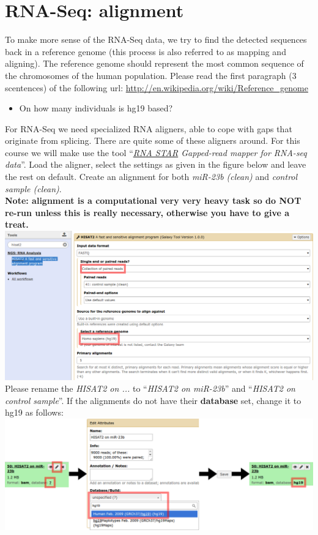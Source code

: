 \section{RNA-Seq: alignment}
To make more sense of the RNA-Seq data, we try to find the detected sequences back in a reference genome (this process is also referred to as mapping and aligning).
The reference genome should represent the most common sequence of the chromosomes of the human population.
Please read the first paragraph (3 scentences) of the following url: \url{http://en.wikipedia.org/wiki/Reference_genome}
\begin{itemize}
	\item On how many individuals is hg19 based?
\end{itemize}
For RNA-Seq we need specialized RNA aligners, able to cope with gaps that originate from splicing.
There are quite some of these aligners around.
For this course we will make use the tool ``\textit{\underline{RNA STAR} Gapped-read mapper for RNA-seq data}''.
Load the aligner, select the settings as given in the figure below and leave the rest on default.
Create an alignment for both \textit{miR-23b (clean)} and \textit{control sample (clean)}. \\
\textbf{Note: alignment is a computational very very heavy task so do NOT re-run unless this is really necessary, otherwise you have to give a treat.}\\
\includegraphics[width=\textwidth]{figures/alignment_01.png}\\
Please rename the \textit{HISAT2 on ...} to ``\textit{HISAT2 on miR-23b}'' and ``\textit{HISAT2 on control sample}''.
If the alignments do not have their \textbf{database} set, change it to hg19 as follows:\\
\includegraphics[width=\textwidth]{figures/alignment_02.png}\\
